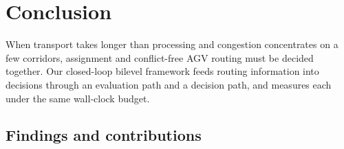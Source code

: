 \documentclass[manuscript,screen,review]{acmart}
\newcommand{\NSeeds}{10}
\begin{document}
\begin{table}[t]
\caption{Degenerate comparison on public benchmarks (exclusivity removed). \textsc{opt}: MILP-proven optimum; \textsc{bk}: best published value; gap from the best of \NSeeds{} seeds; asterisk: identical to the reference.}
\label{tab:external}
\centering
\small

\end{table}



\section{Conclusion}

When transport takes longer than processing and congestion concentrates on a few corridors, assignment and conflict-free AGV routing must be decided together. Our closed-loop bilevel framework feeds routing information into decisions through an evaluation path and a decision path, and measures each under the same wall-clock budget.

\subsection{Findings and contributions}
\label{sec:contributions}
\end{document}
